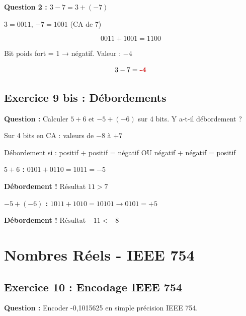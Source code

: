 \documentclass[12pt,a4paper]{article}
\begin{document}
\begin{solution}
\textbf{Question 2 : $3 - 7 = 3 + (-7)$}

$3 = 0011$, $-7 = 1001$ (CA de 7)

$$0011 + 1001 = 1100$$

Bit poids fort = 1 → négatif. Valeur : $-4$

$$3 - 7 = \textcolor{importantrouge}{\textbf{-4}}$$
\end{solution}

\newpage
\subsection{Exercice 9 bis : Débordements}

\begin{exercice}
\textbf{Question :} Calculer $5 + 6$ et $-5 + (-6)$ sur 4 bits. Y a-t-il débordement ?
\end{exercice}

\begin{remarque}
Sur 4 bits en CA : valeurs de $-8$ à $+7$

Débordement si : positif + positif = négatif OU négatif + négatif = positif
\end{remarque}

\begin{solution}
\textbf{$5 + 6$ :} $0101 + 0110 = 1011 = -5$

\textcolor{importantrouge}{\textbf{Débordement !}} Résultat $11 > 7$
\end{solution}

\begin{solution}
\textbf{$-5 + (-6)$ :} $1011 + 1010 = 10101 \rightarrow 0101 = +5$

\textcolor{importantrouge}{\textbf{Débordement !}} Résultat $-11 < -8$
\end{solution}

\newpage
\section{Nombres Réels - IEEE 754}

\subsection{Exercice 10 : Encodage IEEE 754}

\begin{exercice}
\textbf{Question :} Encoder -0,1015625 en simple précision IEEE 754.
\end{exercice}
\end{document}
